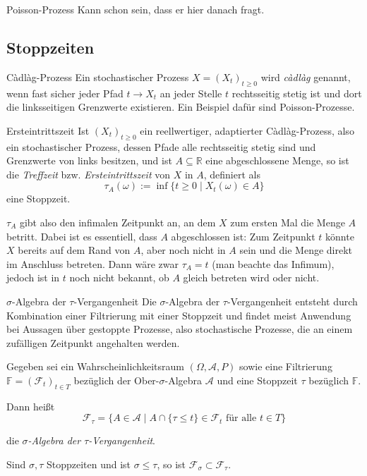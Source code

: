 \begin{info}{Poisson-Prozess}
    Kann schon sein, dass er hier danach fragt.
\end{info}

\subsection{Stoppzeiten}

\begin{bonus}{Càdlàg-Prozess}
    Ein stochastischer Prozess $X=(X_{t})_{t\geq 0}$ wird \emph{càdlàg} genannt, wenn fast sicher jeder Pfad $t\rightarrow X_{t}$ an jeder Stelle $t$ rechtsseitig stetig ist und dort die linksseitigen Grenzwerte existieren.
    Ein Beispiel dafür sind Poisson-Prozesse.
\end{bonus}

\begin{defi}[Stoppzeit]{Ersteintrittszeit}
    Ist $(X_{t})_{t\geq 0}$ ein reellwertiger, adaptierter Càdlàg-Prozess, also ein stochastischer Prozess, dessen Pfade alle rechtsseitig stetig sind und Grenzwerte von links besitzen, und ist $A\subseteq \mathbb{R}$ eine abgeschlossene Menge, so ist die \emph{Treffzeit} bzw. \emph{Ersteintrittszeit} von $X$ in $A$, definiert als
    \[
        \tau_{A}(\omega ):=\inf\{t\geq 0 \mid X_{t}(\omega )\in A\}
    \]
    eine Stoppzeit.

    $\tau_{A}$ gibt also den infimalen Zeitpunkt an, an dem $X$ zum ersten Mal die Menge $A$ betritt.
    Dabei ist es essentiell, dass $A$ abgeschlossen ist:
    Zum Zeitpunkt $t$ könnte $X$ bereits auf dem Rand von $A$, aber noch nicht in $A$ sein und die Menge direkt im Anschluss betreten.
    Dann wäre zwar $\tau_{A}=t$ (man beachte das Infimum), jedoch ist in $t$ noch nicht bekannt, ob $A$ gleich betreten wird oder nicht.
\end{defi}

\begin{defi}[Stoppzeit]{$\sigma$-Algebra der $\tau$-Vergangenheit}
    Die $\sigma$-Algebra der $\tau$-Vergangenheit entsteht durch Kombination einer Filtrierung mit einer Stoppzeit und findet meist Anwendung bei Aussagen über gestoppte Prozesse, also stochastische Prozesse, die an einem zufälligen Zeitpunkt angehalten werden.

    Gegeben sei ein Wahrscheinlichkeitsraum $(\Omega ,{\mathcal{A}},P)$ sowie eine Filtrierung $\mathbb{F} = ({\mathcal{F}}_{t})_{t\in T}$ bezüglich der Ober-$\sigma$-Algebra $\mathcal{A}$ und eine Stoppzeit $\tau$ bezüglich $\mathbb{F}$.

    Dann heißt
    \[
        \mathcal{F}_{\tau} = \{A\in{\mathcal{A}} \mid A\cap \{\tau \leq t\}\in{\mathcal{F}}_{t}{\text{ für alle }}t\in T\}
    \]

    die \emph{$\sigma$-Algebra der $\tau$-Vergangenheit}.

    Sind $\sigma ,\tau$ Stoppzeiten und ist $\sigma \leq \tau$, so ist $\mathcal{F}_{\sigma }\subset{\mathcal{F}}_{\tau }$.
\end{defi}

